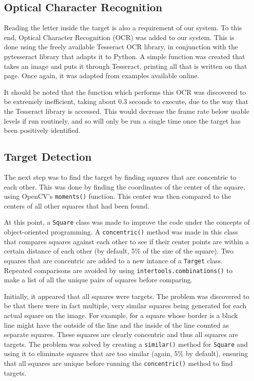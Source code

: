 \documentclass[11pt]{article}
\begin{document}
\subsection{Optical Character Recognition}
Reading the letter inside the target is also a requirement of our system. To this end, Optical Character Recognition (OCR) was added to our system. This is done using the freely available Tesseract OCR library, in conjunction with the pytesseract library that adapts it to Python. A simple function was created that takes an image and puts it through Tesseract, printing all that is written on that page. Once again, it was adapted from examples available online\cite{pyimagesearch_ocr}.

It should be noted that the function which performs this OCR was discovered to be extremely inefficient, taking about 0.3 seconds to execute, due to the way that the Tesseract library is accessed. This would decrease the frame rate below usable levels if run routinely, and so will only be run a single time once the target has been positively identified.

\subsection{Target Detection}
The next step was to find the target by finding squares that are concentric to each other. This was done by finding the coordinates of the center of the square, using OpenCV's \lstinline|moments()| function. This center was then compared to the centers of all other squares that had been found.

At this point, a \lstinline|Square| class was made to improve the code under the concepts of object-oriented programming. A \lstinline|concentric()| method was made in this class that compares squares against each other to see if their center points are within a certain distance of each other (by default, 5\% of the size of the square). Two squares that are concentric are added to a new intance of a \lstinline|Target| class. Repeated comparisons are avoided by using \lstinline|intertools.combinations()| to make a list of all the unique pairs of squares before comparing.

Initially, it appeared that all squares were targets. The problem was discovered to be that there were in fact multiple, very similar squares being generated for each actual square on the image. For example, for a square whose border is a black line might have the outside of the line and the inside of the line counted as separate squares. These squares are clearly concentric and thus all squares are targets. The problem was solved by creating a \lstinline|similar()| method for \lstinline|Square| and using it to eliminate squares that are too similar (again, 5\% by default), ensuring that all squares are unique before running the \lstinline|concentric()| method to find targets.
\end{document}
